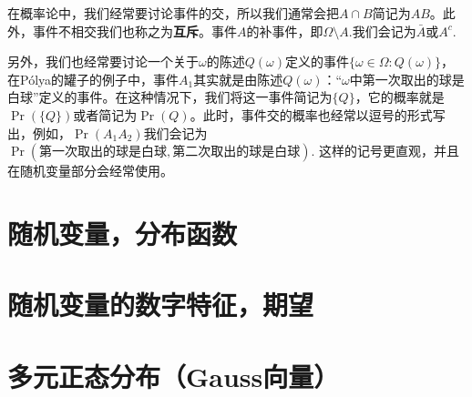 \begin{remark}
    在概率论中，我们经常要讨论事件的交，所以我们通常会把$A\cap B$简记为$AB$。此外，事件不相交我们也称之为\textbf{互斥}。事件$A$的补事件，即$\Omega\setminus A$.我们会记为$\bar{A}$或$A^c$.
    
    另外，我们也经常要讨论一个关于$\omega$的陈述$Q(\omega)$定义的事件$\{\omega\in\Omega:Q(\omega)\}$，在P\'olya的罐子的例子中，事件$A_1$其实就是由陈述$Q(\omega)$：“$\omega$中第一次取出的球是白球”定义的事件。在这种情况下，我们将这一事件简记为$\{Q\}$，它的概率就是$\Pr(\{Q\})$或者简记为$\Pr(Q)$。此时，事件交的概率也经常以逗号的形式写出，例如，$\Pr(A_1A_2)$我们会记为$\Pr(\text{第一次取出的球是白球},\text{第二次取出的球是白球})$. 这样的记号更直观，并且在随机变量部分会经常使用。
\end{remark}
\section{随机变量，分布函数}\label{sec:random-variable}

\section{随机变量的数字特征，期望}

\section{多元正态分布（Gauss向量）}